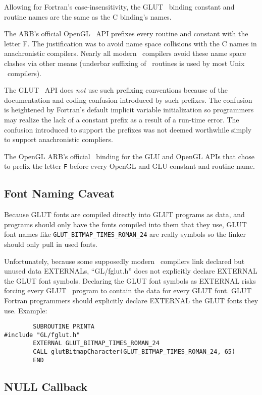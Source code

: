 Allowing for {\sc Fortran}'s case-insensitivity, the GLUT \Fortran\ binding
constant and routine names are the same as the C binding's names.

The ARB's official OpenGL \Fortran\ API prefixes every routine and
constant with the letter F.  The justification was to avoid name
space collisions with the C names in anachronistic compilers.  Nearly
all modern \Fortran\ compilers avoid these name space clashes via other
means (underbar suffixing of \Fortran\ routines is used by most Unix \Fortran\
compilers).

The GLUT \Fortran\ API does {\em not} use such prefixing conventions
because of the documentation and coding confusion introduced by
such prefixes.  The confusion is heightened by
{\sc Fortran}'s default implicit variable initialization so programmers
may realize the lack of a constant prefix as a result of a run-time error.
The confusion introduced to support the prefixes
was not deemed worthwhile simply to support anachronistic
compliers.

The OpenGL ARB's official \Fortran\ binding for the GLU and OpenGL APIs
that chose to prefix the letter {\tt F} before every OpenGL and GLU
constant and routine name.  

\subsection{Font Naming Caveat}

Because GLUT fonts are compiled directly into GLUT programs as data,
and programs should only have the fonts compiled into them that they use,
GLUT font names like {\tt GLUT\_BITMAP\_TIMES\_ROMAN\_24} are really
symbols so the linker should only pull in used fonts.

Unfortunately, because some supposedly modern \Fortran\ compilers
link declared but unused data EXTERNALs, ``GL/fglut.h'' does not
explicitly declare EXTERNAL the GLUT font symbols.  Declaring the
GLUT font symbols as 
EXTERNAL risks forcing every GLUT \Fortran\
program to contain the data for every GLUT font.  GLUT
Fortran programmers should explicitly declare EXTERNAL
the GLUT fonts they use.  Example:
\begin{verbatim}
        SUBROUTINE PRINTA
#include "GL/fglut.h"
        EXTERNAL GLUT_BITMAP_TIMES_ROMAN_24
        CALL glutBitmapCharacter(GLUT_BITMAP_TIMES_ROMAN_24, 65)
        END
\end{verbatim}

\subsection{NULL Callback}

